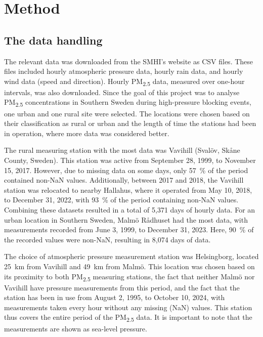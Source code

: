 \newpage
\section{Method}
\subsection{The data handling}
The relevant data was downloaded from the SMHI’s website as CSV files. These files included hourly atmospheric pressure data, hourly rain data, and hourly wind data (speed and direction). Hourly PM\textsubscript{2.5} data, measured over one-hour intervals, was also downloaded. Since the goal of this project was to analyse PM\textsubscript{2.5} concentrations in Southern Sweden during high-pressure blocking events, one urban and one rural site were selected. The locations were chosen based on their classification as rural or urban and the length of time the stations had been in operation, where more data was considered better. 

The rural measuring station with the most data was Vavihill (Svalöv, Skåne County, Sweden). This station was active from September 28, 1999, to November 15, 2017. However, due to missing data on some days, only \SI{57}{\%} of the period contained non-NaN values. Additionally, between 2017 and 2018, the Vavihill station was relocated to nearby Hallahus, where it operated from May 10, 2018, to December 31, 2022, with \SI{93}{\%} of the period containing non-NaN values. Combining these datasets resulted in a total of 5,371 days of hourly data. For an urban location in Southern Sweden, Malmö Rådhuset had the most data, with measurements recorded from June 3, 1999, to December 31, 2023. Here, \SI{90}{\%} of the recorded values were non-NaN, resulting in 8,074 days of data.

The choice of atmospheric pressure measurement station was Helsingborg, located \SI{25}{\km} from Vavihill and \SI{49}{\km} from Malmö. This location was chosen based on its proximity to both PM\textsubscript{2.5} measuring stations, the fact that neither Malmö nor Vavihill have pressure measurements from this period, and the fact that the station has been in use from August 2, 1995, to October 10, 2024, with measurements taken every hour without any missing (NaN) values. This station thus covers the entire period of the PM\textsubscript{2.5} data. It is important to note that the measurements are shown as sea-level pressure.

